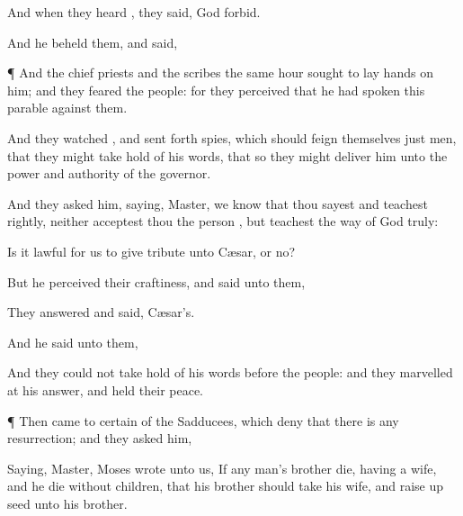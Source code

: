 {

 And
when they
heard
{}, they
said, God
forbid.

And he
beheld
them, and
said,
{}



\par }{\PP {}¶
And the chief
priests
and the
scribes the
same
hour
sought to
lay
hands
on
him;
and they
feared the
people:
for they
perceived
that he had
spoken
this
parable
against
them.

And they
watched
{}, and sent
forth
spies, which should
feign
themselves just
men,
that they might take
hold of
his
words, that
so they might
deliver
him
unto the
power
and
authority of the
governor.

And they
asked
him,
saying,
Master, we
know
that thou
sayest
and
teachest
rightly,
neither acceptest
thou the
person
{},
but
teachest the
way of
God
truly:

Is it
lawful for
us to
give
tribute unto
Cæsar,
or
no?

But he
perceived
their
craftiness, and
said
unto
them,
{}

 They
answered
and
said,
Cæsar’s.

And he
said unto
them,
{}

And they
could
not take hold
of
his
words
before the
people:
and they
marvelled
at
his
answer, and held their
peace.


\par }{\PP {}¶
Then came
to
{}
certain of the
Sadducees,
which deny
that there
is any
resurrection; and they
asked
him,

Saying,
Master,
Moses
wrote unto
us,
If any
man’s
brother
die,
having a
wife,
and
he
die without
children,
that
his
brother should
take his
wife,
and raise
up
seed unto
his
brother.

}
